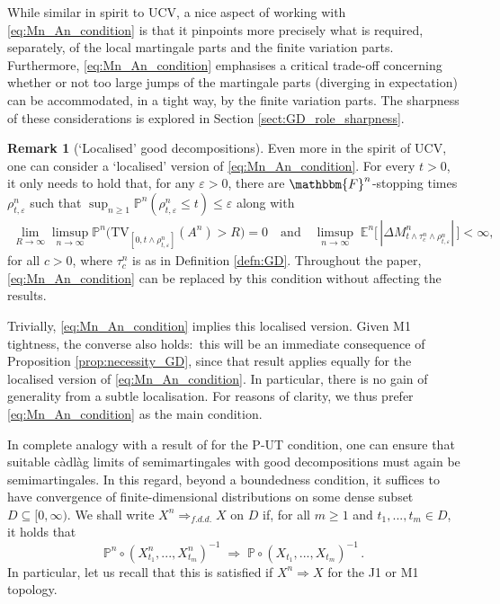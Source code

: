 \documentclass[11pt]{article}
\theoremstyle{definition}\newtheorem{example}[theorem]{Example}
\theoremstyle{definition}\newtheorem{counterexample}[theorem]{Counterexample}
\theoremstyle{definition}\newtheorem{remark}[theorem]{Remark}
\theoremstyle{definition}\newtheorem{defi}[theorem]{Definition}
\numberwithin{equation}{section}
\newcommand{\Pro}{\mathbb{P}}										%
\renewcommand{\|}{\; : \, \;}											%
\begin{document}
While similar in spirit to UCV, a nice aspect of working with \eqref{eq:Mn_An_condition} is that it pinpoints more precisely what is required, separately, of the local martingale parts and the finite variation parts. Furthermore, \eqref{eq:Mn_An_condition} emphasises a critical trade-off concerning whether or not too large jumps of the martingale parts (diverging in expectation) can be accommodated, in a tight way, by the finite variation parts. The sharpness of these considerations is explored in Section \ref{sect:GD_role_sharpness}.

\begin{remark}[`Localised' good decompositions] \label{rem:localised_GD}
	Even more in the spirit of UCV, one can consider a `localised' version of \eqref{eq:Mn_An_condition}. For every $t>0$, it only needs to hold that, for any $\varepsilon>0$, there are $\mathbbm{F}^n$-stopping times $\rho^n_{t,\varepsilon}$ such that $\operatorname{sup}_{n\geq 1}\Pro^n(\rho^n_{t,\varepsilon} \le t)\le \varepsilon$ along with
	\begin{align*}
		\lim_{R\rightarrow \infty}  \limsup_{n\rightarrow\infty }  \mathbb{P}^n\bigl(\text{TV}_{[0,t\wedge \rho^n_{t,\varepsilon}]}(A^n)>R\bigr)=0 \quad \text{and} \quad
		\limsup_{n\rightarrow \infty} \; \mathbb{E}^n\bigl[\, |\Delta M^n_{t \wedge \tau^n_c \wedge \rho^n_{t,\varepsilon}}|\, \bigr] <\infty,
	\end{align*}
	for all $c>0$, where $\tau^n_c$ is as in Definition \ref{defn:GD}. Throughout the paper, \eqref{eq:Mn_An_condition} can be replaced by this condition without affecting the results.
\end{remark}

Trivially, \eqref{eq:Mn_An_condition} implies this localised version. Given M1 tightness, the converse also holds:~this will be an immediate consequence of Proposition \ref{prop:necessity_GD}, since that result applies equally for the localised version of \eqref{eq:Mn_An_condition}. In particular, there is no gain of generality from a subtle localisation. For reasons of clarity, we thus prefer \eqref{eq:Mn_An_condition} as the main condition.

In complete analogy with a result of \cite{jakubowskimeminpages} for the P-UT condition, one can ensure that suitable càdlàg limits of semimartingales with good decompositions must again be semimartingales. In this regard, beyond a boundedness condition, it suffices to have convergence of finite-dimensional distributions on some dense subset $D \subseteq [0,\infty)$. We shall write $X^n \Rightarrow_{f.d.d.} X$ on $D$ if, for all $m\ge 1$ and $t_1,...,t_m \in D$, it holds that
$$ \Pro^n \circ (X^n_{t_1},...,X^n_{t_m})^{-1} \; \Rightarrow \; \Pro \circ (X_{t_1},...,X_{t_m})^{-1}\, .$$
In particular, let us recall that this is satisfied if $X^n \Rightarrow X$ for the J1 or M1 topology.
\end{document}
